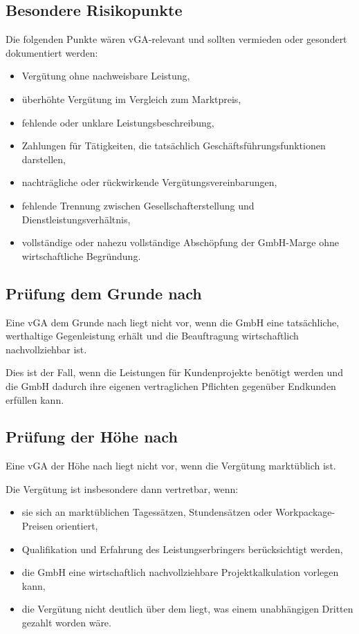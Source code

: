 \documentclass[11pt,a4paper]{article}
\begin{document}
\subsection{Besondere Risikopunkte}

Die folgenden Punkte wären vGA-relevant und sollten vermieden oder gesondert dokumentiert werden:

\begin{itemize}
    \item Vergütung ohne nachweisbare Leistung,
    \item überhöhte Vergütung im Vergleich zum Marktpreis,
    \item fehlende oder unklare Leistungsbeschreibung,
    \item Zahlungen für Tätigkeiten, die tatsächlich Geschäftsführungsfunktionen darstellen,
    \item nachträgliche oder rückwirkende Vergütungsvereinbarungen,
    \item fehlende Trennung zwischen Gesellschafterstellung und Dienstleistungsverhältnis,
    \item vollständige oder nahezu vollständige Abschöpfung der GmbH-Marge ohne wirtschaftliche Begründung.
\end{itemize}

\subsection{Prüfung dem Grunde nach}

Eine vGA dem Grunde nach liegt nicht vor, wenn die GmbH eine tatsächliche, werthaltige Gegenleistung erhält und die Beauftragung wirtschaftlich nachvollziehbar ist.

Dies ist der Fall, wenn die Leistungen für Kundenprojekte benötigt werden und die GmbH dadurch ihre eigenen vertraglichen Pflichten gegenüber Endkunden erfüllen kann.

\subsection{Prüfung der Höhe nach}

Eine vGA der Höhe nach liegt nicht vor, wenn die Vergütung marktüblich ist.

Die Vergütung ist insbesondere dann vertretbar, wenn:

\begin{itemize}
    \item sie sich an marktüblichen Tagessätzen, Stundensätzen oder Workpackage-Preisen orientiert,
    \item Qualifikation und Erfahrung des Leistungserbringers berücksichtigt werden,
    \item die GmbH eine wirtschaftlich nachvollziehbare Projektkalkulation vorlegen kann,
    \item die Vergütung nicht deutlich über dem liegt, was einem unabhängigen Dritten gezahlt worden wäre.
\end{itemize}
\end{document}
